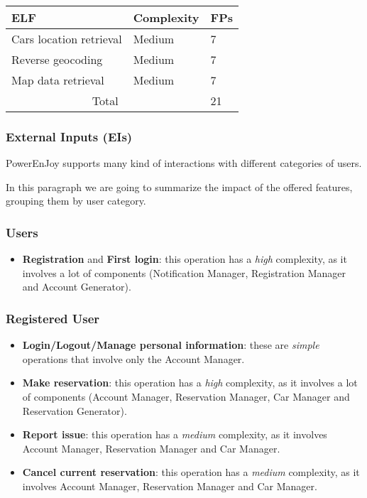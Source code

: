 \begin{table}[H]
	\centering
	\begin{tabular}{| m{4cm} | m{2.5cm} | m{1cm} |}
		\hline
		\textbf{ELF} & \textbf{Complexity} & \textbf{FPs}\\
		\hline
		Cars location retrieval & Medium & 7\\
		Reverse geocoding & Medium & 7\\
		Map data retrieval & Medium & 7\\
		\hline
		\multicolumn{2}{|c|}{Total} & 21\\
		\hline
	\end{tabular}
\end{table}

\subsubsection{External Inputs (EIs)}
PowerEnJoy supports many kind of interactions with different categories of users.

In this paragraph we are going to summarize the impact of the offered features, grouping them by user category.
\subsubsection*{Users}
\begin{itemize}
	\item \textbf{Registration} and \textbf{First login}: this operation has a \textit{high} complexity, as it involves a lot of components (Notification Manager, Registration Manager and Account Generator).
\end{itemize}

\subsubsection*{Registered User}
\begin{itemize}
	\item \textbf{Login/Logout/Manage personal information}: these are \textit{simple} operations that involve only the Account Manager.
	\item \textbf{Make reservation}: this operation has a \textit{high} complexity, as it involves a lot of components (Account Manager, Reservation Manager, Car Manager and Reservation Generator).
	\item \textbf{Report issue}: this operation has a \textit{medium} complexity, as it involves Account Manager, Reservation Manager and Car Manager.
	\item \textbf{Cancel current reservation}: this operation has a \textit{medium} complexity, as it involves Account Manager, Reservation Manager and Car Manager.
\end{itemize}

